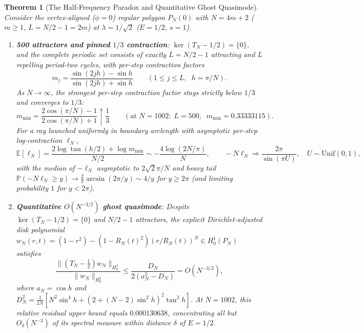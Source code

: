 \documentclass[11pt,reqno]{amsart}
\newtheorem{theorem}{Theorem}[section]
\theoremstyle{definition}
\theoremstyle{remark}
\begin{document}
\begin{theorem}[The Half-Frequency Paradox and Quantitative Ghost Quasimode]\label{thm:half-freq-paradox}
Consider the vertex-aligned ($\phi = 0$) regular polygon $P_N(0)$ with $N = 4m + 2$ ($m \ge 1$, $L = N/2 - 1 = 2m$) at $\lambda = 1/\sqrt{2}$ ($E = 1/2$, $s = 1$).
\begin{enumerate}
  \item \textbf{500 attractors and pinned $1/3$ contraction}: $\ker(T_N - 1/2) = \{0\}$, and the complete periodic set consists of exactly $L = N/2 - 1$ attracting and $L$ repelling period-two cycles, with per-step contraction factors
  \begin{equation}\label{eq:half-freq-factors}
    m_j = \frac{\sin(2jh) - \sin h}{\sin(2jh) + \sin h} \qquad (1 \le j \le L,\;\; h = \pi/N).
  \end{equation}
  As $N \to \infty$, the strongest per-step contraction factor stays strictly below $1/3$ and converges to $1/3$:
  \[
    m_{\min} = \frac{2\cos(\pi/N) - 1}{2\cos(\pi/N) + 1} \uparrow \frac{1}{3} \qquad (\text{at } N=1002:\; L=500,\;\; m_{\min} = 0.33333115).
  \]
  For a ray launched uniformly in boundary arclength with asymptotic per-step log-contraction $\ell_N$,
  \begin{equation}\label{eq:arcsine-law}
    \mathbb{E}[\ell_N] = \frac{2\log\tan(h/2) + \log m_{\min}}{N/2} \sim -\frac{4\log(2N/\pi)}{N}, \qquad
    -N\ell_N \Longrightarrow \frac{2\pi}{\sin(\pi U)}, \quad U \sim \mathrm{Unif}(0,1),
  \end{equation}
  with the median of $-\ell_N$ asymptotic to $2\sqrt{2}\pi/N$ and heavy tail $\mathbb{P}(-N\ell_N \ge y) \to \frac{2}{\pi}\arcsin(2\pi/y) \sim 4/y$ for $y \ge 2\pi$ (and limiting probability $1$ for $y < 2\pi$).
  \item \textbf{Quantitative $O(N^{-3/2})$ ghost quasimode}: Despite $\ker(T_N - 1/2) = \{0\}$ and $N/2 - 1$ attractors, the explicit Dirichlet-adjusted disk polynomial $w_N(r,t) = (1 - r^2) - (1 - R_N(t)^2)(r/R_N(t))^N \in H_0^1(P_N)$ satisfies
  \begin{equation}\label{eq:quasimode}
    \frac{\|(T_N - \tfrac{1}{2})w_N\|_{H_0^1}}{\|w_N\|_{H_0^1}} \le \frac{D_N}{2(a_N^2 - D_N)} = O(N^{-3/2}),
  \end{equation}
  where $a_N = \cos h$ and $D_N^2 = \frac{1}{2N}[N^2\sin^4 h + (2 + (N-2)\sin^2 h)^2 \tan^2 h]$. At $N = 1002$, this relative residual upper bound equals $0.000130638$, concentrating all but $O_\delta(N^{-3})$ of its spectral measure within distance $\delta$ of $E = 1/2$.
\end{enumerate}
\end{theorem}
\end{document}

